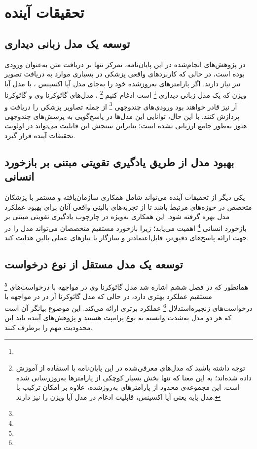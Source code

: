 \section{
تحقیقات آینده
}

\subsection{
توسعه یک مدل زبانی دیداری
}
در پژوهش‌های انجام‌شده در این پایان‌نامه، تمرکز تنها بر دریافت متن به‌عنوان ورودی بوده است، در حالی که کاربردهای واقعی پزشکی در بسیاری موارد به دریافت تصویر نیز نیاز دارند. اگر پارامترهای به‌روزشده خود را به‌جای مدل آیا اکسپنس
\cite{b71}
، با مدل آیا ویژن
\cite{b74}
که یک مدل زبانی‌ دیداری
\footnote{}
است ادغام کنیم
\footnote{
توجه داشته باشید که مدل‌های معرفی‌شده در این پایان‌نامه با استفاده از
آموزش داده شده‌اند؛ به این معنا که تنها بخش بسیار کوچکی از پارامترها به‌روزرسانی شده است. این مجموعه‌ی محدود از پارامترهای به‌روزشده، علاوه بر امکان ترکیب با مدل پایه یعنی آیا اکسپنس، قابلیت ادغام در مدل آیا ویژن را نیز دارند.
}
، مدل‌های گائوکرنا وی و گائوکرنا آر نیز قادر خواهند بود ورودی‌های چندوجهی
\footnote{}
از جمله تصاویر پزشکی را دریافت و پردازش کنند. با این حال، توانایی این مدل‌ها در پاسخ‌گویی به پرسش‌های چندوجهی هنوز به‌طور جامع ارزیابی نشده است؛ بنابراین سنجش این قابلیت می‌تواند در اولویت تحقیقات آینده قرار گیرد.


\subsection{
بهبود مدل از طریق یادگیری تقویتی مبتنی بر بازخورد انسانی
}
یکی دیگر از تحقیقات آینده می‌تواند شامل همکاری سازمان‌یافته و مستمر با پزشکان متخصص در حوزه‌های مرتبط باشد تا از تجربه‌های بالینی واقعی آنان برای بهبود عملکرد مدل بهره گرفته شود. این همکاری به‌ویژه در چارچوب یادگیری تقویتی مبتنی بر بازخورد انسانی
\footnote{}
اهمیت می‌یابد؛ زیرا بازخورد مستقیم متخصصان می‌تواند مدل را در جهت ارائه پاسخ‌های دقیق‌تر، قابل‌اعتمادتر و سازگار با نیازهای عملی بالین هدایت کند.

\subsection{
توسعه یک مدل مستقل از نوع درخواست
}
همانطور که در فصل ششم اشاره شد مدل گائوکرنا وی در مواجهه با درخواست‌های
\footnote{}
مستقیم عملکرد بهتری دارد، در حالی که مدل گائوکرنا آر در در مواجهه با درخواست‌های زنجیره‌استدلال
\footnote{}
عملکرد برتری ارائه می‌کند. این موضوع بیانگر آن است که هر دو مدل به‌شدت وابسته به نوع پرامپت هستند و پژوهش‌های آینده باید این محدودیت مهم را برطرف کنند.

